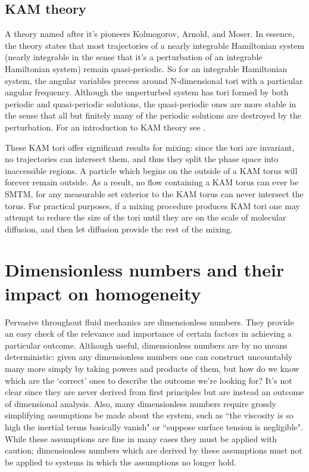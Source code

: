 \documentclass[a4paper,12pt]{article}
\begin{document}
\subsection{KAM theory} 

A theory named after it's pioneers Kolmogorov, Arnold, and Moser. In essence, the theory states that most trajectories of a nearly integrable Hamiltonian system (nearly integrable in the sense that it's a perturbation of an integrable Hamiltonian system) remain quasi-periodic. So for an integrable Hamiltonian system, the angular variables precess around N-dimensional tori with a particular angular frequency. Although the unperturbed system has tori formed by both periodic and quasi-periodic solutions, the quasi-periodic ones are more stable in the sense that all but finitely many of the periodic solutions are destroyed by the perturbation. For an introduction to KAM theory see \cite{w08}. 

These KAM tori offer significant results for mixing: since the tori are invariant, no trajectories can intersect them, and thus they split the phase space into inaccessible regions. A particle which begins on the outside of a KAM torus will forever remain outside. As a result, no flow containing a KAM torus can ever be SMTM, for any measurable set exterior to the KAM torus can never intersect the torus. For practical purposes, if a mixing procedure produces KAM tori one may attempt to reduce the size of the tori until they are on the scale of molecular diffusion, and then let diffusion provide the rest of the mixing.
\section{Dimensionless numbers and their impact on homogeneity} 

Pervasive throughout fluid mechanics are dimensionless numbers. They provide an easy check of the relevance and importance of certain factors in achieving a particular outcome. Although useful, dimensionless numbers are by no means deterministic: given any dimensionless numbers one can construct uncountably many more simply by taking powers and products of them, but how do we know which are the `correct' ones to describe the outcome we're looking for? It's not clear since they are never derived from first principles but are instead an outcome of dimensional analysis. Also, many dimensionless numbers require grossly simplifying assumptions be made about the system, such as ``the viscosity is so high the inertial terms basically vanish" or ``suppose surface tension is negligible". While these assumptions are fine in many cases they must be applied with caution; dimensionless numbers which are derived by these assumptions must not be applied to systems in which the assumptions no longer hold.
\end{document}
